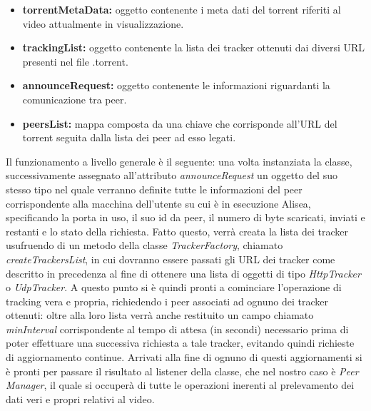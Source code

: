 \documentclass[a4]{book}
\begin{document}
\begin{itemize}
	\item \textbf{torrentMetaData:} oggetto contenente i meta dati del torrent riferiti al video attualmente in visualizzazione.
	\item \textbf{trackingList:} oggetto contenente la lista dei tracker ottenuti dai diversi URL presenti nel file .torrent.
	\item \textbf{announceRequest: } oggetto contenente le informazioni riguardanti la comunicazione tra peer.
	\item \textbf{peersList:} mappa composta da una chiave che corrisponde all'URL del torrent seguita dalla lista dei peer ad esso legati.
\end{itemize}

Il funzionamento a livello generale è il seguente: una volta instanziata la classe, successivamente assegnato all'attributo \textit{announceRequest} un oggetto del suo stesso tipo nel quale verranno definite tutte le informazioni del peer corrispondente alla macchina dell'utente su cui è in esecuzione Alisea, specificando la porta in uso, il suo id da peer, il numero di byte scaricati, inviati e restanti e lo stato della richiesta. Fatto questo, verrà creata la lista dei tracker usufruendo di un metodo della classe \textit{TrackerFactory}, chiamato \textit{createTrackersList}, in cui dovranno essere passati gli URL dei tracker come descritto in precedenza al fine di ottenere una lista di oggetti di tipo \textit{HttpTracker} o \textit{UdpTracker}. A questo punto si è quindi pronti a cominciare l'operazione di tracking vera e propria, richiedendo i peer associati ad ognuno dei tracker ottenuti: oltre alla loro lista verrà anche restituito un campo chiamato \textit{minInterval} corrispondente al tempo di attesa (in secondi) necessario prima di poter effettuare una successiva richiesta a tale tracker, evitando quindi richieste di aggiornamento continue. Arrivati alla fine di ognuno di questi aggiornamenti si è pronti per passare il risultato al listener della classe, che nel nostro caso è \textit{Peer Manager}, il quale si occuperà di tutte le operazioni inerenti al prelevamento dei dati veri e propri relativi al video.\newline
\end{document}
